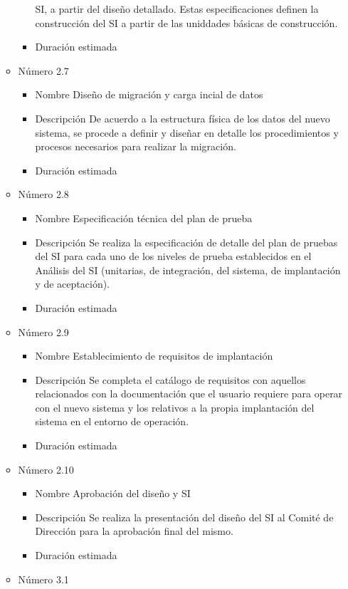 \documentclass[11pt,a4paper,spanish,twoside]{report}
\begin{document}
\begin{itemize}
\begin{itemize}
\begin{itemize}
SI, a partir del diseño detallado. Estas especificaciones definen la 
construcción del SI a partir de las uniddades básicas de construcción.
\item{Duración estimada} 
\end{itemize}
\item{Número} 2.7
\begin{itemize}
\item{Nombre} Diseño de migración y carga incial de datos
\item{Descripción} De acuerdo a la estructura física de los datos del nuevo 
sistema, se procede a definir y diseñar en detalle los procedimientos y 
procesos necesarios para realizar la migración.
\item{Duración estimada} 
\end{itemize}
\item{Número} 2.8
\begin{itemize}
\item{Nombre} Especificación técnica del plan de prueba
\item{Descripción} Se realiza la especificación de detalle del plan de pruebas 
del SI para cada uno de los niveles de prueba establecidos en el Análisis del 
SI (unitarias, de integración, del sistema, de implantación y de aceptación).
\item{Duración estimada} 
\end{itemize}
\item{Número} 2.9
\begin{itemize}
\item{Nombre} Establecimiento de requisitos de implantación
\item{Descripción} Se completa el catálogo de requisitos con aquellos 
relacionados con la documentación que el usuario requiere para operar con el 
nuevo sistema y los relativos a la propia implantación del sistema en el 
entorno de operación.
\item{Duración estimada} 
\end{itemize}
\item{Número} 2.10
\begin{itemize}
\item{Nombre} Aprobación del diseño y SI
\item{Descripción} Se realiza la presentación del diseño del SI al Comité de 
Dirección para la aprobación final del mismo.
\item{Duración estimada} 
\end{itemize}
\item{Número} 3.1
\begin{itemize}

\end{itemize}
\end{itemize}
\end{itemize}
\end{document}
